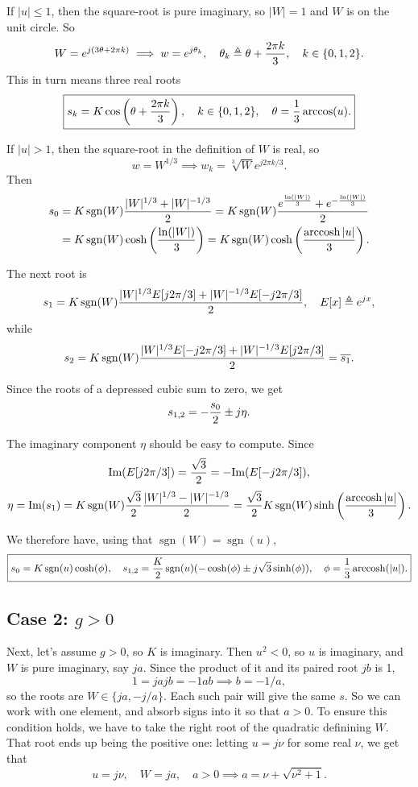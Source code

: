\documentclass[10pt]{article}
\newcommand{\im}{\text{Im}}
\DeclareMathOperator*{\arccosh}{arccosh}
\DeclareMathOperator*{\sign}{sgn}
\begin{document}
If $|u| \le 1 $, then the square-root is pure imaginary, so $|W| = 1$ and $W$ is on the unit circle. So $$W = e^{j (3 \theta + 2\pi k)} \implies w = e^{j \theta_k}, \quad \theta_k \triangleq \theta + {2 \pi k \over 3}, \quad k \in \{0,1,2\}.$$
This in turn means three real roots $$ \boxed{s_k = K \cos\left(\theta + {2 \pi k \over 3}\right), \quad k \in \{0,1,2\}, \quad \theta = {1 \over 3} \arccos(u).}$$

If $|u| > 1$, then the square-root in the definition of $W$ is real, so $$ w = W^{1/3} \implies w_k = \sqrt[3]{W}e^{j2\pi k/3}.$$ Then
\begin{align*}
  s_0 &= K \sign(W){|W|^{1/3} + |W|^{-1/3} \over 2} = K \sign(W){ e^{{\ln(|W|) \over 3}} + e^{-{\ln(|W|) \over 3}} \over 2}\\
  &= K \sign(W)\cosh\left( {\ln(|W|)\over3} \right) = K \sign(W) \cosh\left({ \arccosh |u| \over 3}\right).
\end{align*}

The next root is $$ s_1 = K\sign(W){|W|^{1/3} E[j 2\pi/3] + |W|^{-1/3}E[-j 2\pi/3] \over 2}, \quad E[x] \triangleq e^{j x},$$
while $$ s_2 = K \sign(W){|W|^{1/3} E[-j2\pi/3] + |W|^{-1/3}E[j 2\pi/3] \over 2} = \overline{s_1}.$$

Since the roots of a depressed cubic sum to zero, we get $$ s_{1,2} = -{s_0 \over 2} \pm j \eta.$$

The imaginary component $\eta$ should be easy to compute. Since $$\im(E[j2\pi/3]) = {\sqrt{3} \over 2}= - \im(E[-j2\pi/3]),$$  $$ \eta = \im(s_1)= K \sign(W) {\sqrt{3} \over 2}{|W|^{1/3} - |W|^{-1/3} \over 2} = { \sqrt{3} \over 2} K \sign(W) \sinh\left({\arccosh|u|} \over 3\right).$$

We therefore have, using that $\sign(W) = \sign(u)$, $$ \boxed{s_0 = K \sign(u) \cosh(\phi), \quad s_{1,2} ={K \over 2}\sign(u)(-\cosh(\phi) \pm j\sqrt{3} \sinh(\phi)), \quad \phi = {1 \over 3} \arccosh(|u|).}$$

\subsection*{Case 2: $g > 0$}
Next, let's assume $g > 0$, so $K$ is imaginary. Then $u^2 < 0$, so $u$ is imaginary, and $W$ is pure imaginary, say $j a$. Since the product of it and its paired root $j b$ is 1, $$ 1 = j a j b = -1 a b \implies b = -1/a,$$ so the roots are $W \in \{j a, -j/a\}$. Each such pair will give the same $s$. So we can work with one element, and absorb signs into it so that $a > 0$.  To ensure this condition holds, we have to take the right root of the quadratic definining $W$. That root ends up being the positive one: letting $u = j \nu$ for some real $\nu$, we get that $$u = j\nu, \quad W = j a, \quad a > 0 \implies a = \nu + \sqrt{\nu^2 + 1}.$$ 
\end{document}
